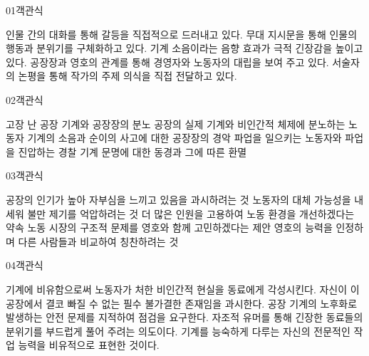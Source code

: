 \documentclass[fs85,seriesWit]{korfarm-base}
\begin{document}
\kfBeginMC
\begin{kfQBlock}{01}{객관식}
\begin{kfChoices}
\kfChoice 인물 간의 대화를 통해 갈등을 직접적으로 드러내고 있다.
\kfChoice 무대 지시문을 통해 인물의 행동과 분위기를 구체화하고 있다.
\kfChoice 기계 소음이라는 음향 효과가 극적 긴장감을 높이고 있다.
\kfChoice 공장장과 영호의 관계를 통해 경영자와 노동자의 대립을 보여 주고 있다.
\kfChoice 서술자의 논평을 통해 작가의 주제 의식을 직접 전달하고 있다.
\end{kfChoices}
\end{kfQBlock}

\begin{kfQBlock}{02}{객관식}
\begin{kfChoices}
\kfChoice 고장 난 공장 기계와 공장장의 분노
\kfChoice 공장의 실제 기계와 비인간적 체제에 분노하는 노동자
\kfChoice 기계의 소음과 순이의 사고에 대한 공장장의 경악
\kfChoice 파업을 일으키는 노동자와 파업을 진압하는 경찰
\kfChoice 기계 문명에 대한 동경과 그에 따른 환멸
\end{kfChoices}
\end{kfQBlock}

\begin{kfQBlock}{03}{객관식}
\begin{kfChoices}
\kfChoice 공장의 인기가 높아 자부심을 느끼고 있음을 과시하려는 것
\kfChoice 노동자의 대체 가능성을 내세워 불만 제기를 억압하려는 것
\kfChoice 더 많은 인원을 고용하여 노동 환경을 개선하겠다는 약속
\kfChoice 노동 시장의 구조적 문제를 영호와 함께 고민하겠다는 제안
\kfChoice 영호의 능력을 인정하며 다른 사람들과 비교하여 칭찬하려는 것
\end{kfChoices}
\end{kfQBlock}

\begin{kfQBlock}{04}{객관식}
\begin{kfChoices}
\kfChoice 기계에 비유함으로써 노동자가 처한 비인간적 현실을 동료에게 각성시킨다.
\kfChoice 자신이 이 공장에서 결코 빠질 수 없는 필수 불가결한 존재임을 과시한다.
\kfChoice 공장 기계의 노후화로 발생하는 안전 문제를 지적하여 점검을 요구한다.
\kfChoice 자조적 유머를 통해 긴장한 동료들의 분위기를 부드럽게 풀어 주려는 의도이다.
\kfChoice 기계를 능숙하게 다루는 자신의 전문적인 작업 능력을 비유적으로 표현한 것이다.
\end{kfChoices}
\end{kfQBlock}
\end{document}
